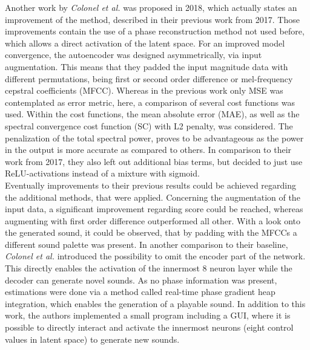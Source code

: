 Another work by \textit{Colonel et al.} was proposed in 2018, which actually states an improvement of the method, described in their previous work from 2017. \cite{colonel2018autoencoding} Those improvements contain the use of a phase reconstruction method not used before, which allows a direct activation of the latent space. For an improved model convergence, the autoencoder was designed asymmetrically, via input augmentation. This means that they padded the input magnitude data with different permutations, being first or second order difference or mel-frequency cepstral coefficients (MFCC). Whereas in the previous work only MSE was contemplated as error metric, here, a comparison of several cost functions was used. Within the cost functions, the mean absolute error (MAE), as well as the spectral convergence cost function (SC) with L2 penalty, was considered. The penalization of the total spectral power, proves to be advantageous as the power in the output is more accurate as compared to others. In comparison to their work from 2017, they also left out additional bias terms, but decided to just use ReLU-activations instead of a mixture with sigmoid.\\
Eventually improvements to their previous results could be achieved regarding the additional methods, that were applied. Concerning the augmentation of the input data, a significant improvement regarding score could be reached, whereas augmenting with first order difference outperformed all other. With a look onto the generated sound, it could be observed, that by padding with the MFCCs a different sound palette was present. In another comparison to their baseline, \textit{Colonel et al.} introduced the possibility to omit the encoder part of the network. This directly enables the activation of the innermost 8 neuron layer while the decoder can generate novel sounds. As no phase information was present, estimations were done via a method called real-time phase gradient heap integration, which enables the generation of a playable sound. In addition to this work, the authors implemented a small program including a GUI, where it is possible to directly interact and activate the innermost neurons (eight control values in latent space) to generate new sounds.\\

